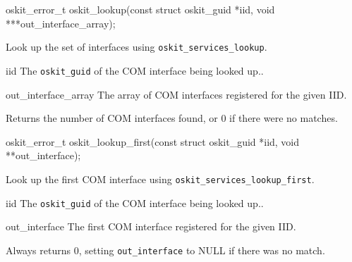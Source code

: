 \begin{apisyn}

	\funcproto oskit_error_t
	oskit_lookup(const struct oskit_guid *iid,
                           \outparam void ***out_interface_array);
\end{apisyn}
\begin{apidesc}
	Look up the set of interfaces using \texttt{oskit_services_lookup}.
\end{apidesc}
\begin{apiparm}
	\item[iid]
		The {\tt oskit_guid} of the COM interface being looked up..
	\item[out_interface_array]
		The array of COM interfaces registered for the given IID.
\end{apiparm}
\begin{apiret}
	Returns the number of COM interfaces found, or 0 if there were no
	matches.
\end{apiret}


\begin{apisyn}

	\funcproto oskit_error_t
	oskit_lookup_first(const struct oskit_guid *iid,
                           \outparam void **out_interface);
\end{apisyn}
\begin{apidesc}
	Look up the first COM interface using
	\texttt{oskit_services_lookup_first}.
\end{apidesc}
\begin{apiparm}
	\item[iid]
		The {\tt oskit_guid} of the COM interface being looked up..
	\item[out_interface]
		The first COM interface registered for the given IID.
\end{apiparm}
\begin{apiret}
	Always returns 0, setting {\tt out_interface} to NULL if there was
	no match.
\end{apiret}
